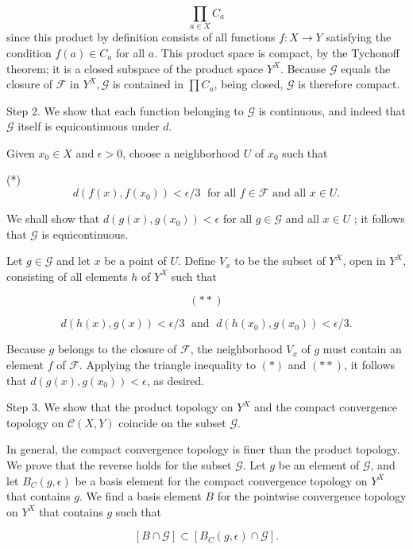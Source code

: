 \[
\mathop{\prod }\limits_{{a \in X}}C_{a}
\]
since this product by definition consists of all functions \(f : X \rightarrow Y\) satisfying the condition \(f( a) \in {C}_{a}\) for all \(a\). This product space is compact, by the Tychonoff theorem; it is a closed subspace of the product space \(Y^{X}\). Because \(\mathcal{G}\) equals the closure of \(\mathcal{F}\) in \(Y^{X},\mathcal{G}\) is contained in \(\prod {C}_{a}\), being closed, \(\mathcal{G}\) is therefore compact.

Step 2. We show that each function belonging to \(\mathcal{G}\) is continuous, and indeed that \(\mathcal{G}\) itself is equicontinuous under \(d\).

Given \(x_{0} \in X\) and \(\epsilon > 0\), choose a neighborhood \(U\) of \(x_{0}\) such that

(*)
\[
d({f(x),f(x_{0}) }) < \epsilon /3\;\text{ for all }f \in \mathcal{F}\text{ and all }x \in U.
\]

We shall show that \(d({g(x),g(x_{0}) }) < \epsilon\) for all \(g \in \mathcal{G}\) and all \(x \in U\) ; it follows that \(\mathcal{G}\) is equicontinuous.

Let \(g \in \mathcal{G}\) and let \(x\) be a point of \(U\). Define \(V_{x}\) to be the subset of \(Y^{X}\), open in \(Y^{X}\), consisting of all elements \(h\) of \(Y^{X}\) such that

\[
({* * })
\]

\[
d({h(x),g(x) }) < \epsilon /3\;\text{ and }\;d({h(x_{0}),g(x_{0}) }) < \epsilon /3.
\]

Because \(g\) belongs to the closure of \(\mathcal{F}\), the neighborhood \(V_{x}\) of \(g\) must contain an element \(f\) of \(\mathcal{F}\). Applying the triangle inequality to \(( *)\) and \(({* * })\), it follows that \(d({g(x),g(x_{0}) }) < \epsilon\), as desired.

Step 3. We show that the product topology on \(Y^{X}\) and the compact convergence topology on \(\mathcal{C}({X,Y})\) coincide on the subset \(\mathcal{G}\).

In general, the compact convergence topology is finer than the product topology. We prove that the reverse holds for the subset \(\mathcal{G}\). Let \(g\) be an element of \(\mathcal{G}\), and let \(B_{C}({g,\epsilon })\) be a basis element for the compact convergence topology on \(Y^{X}\) that contains \(g\). We find a basis element \(B\) for the pointwise convergence topology on \(Y^{X}\) that contains \(g\) such that

\[
[ {B \cap \mathcal{G}}] \subset [ {B_{C}({g,\epsilon }) \cap \mathcal{G}}] .
\]

